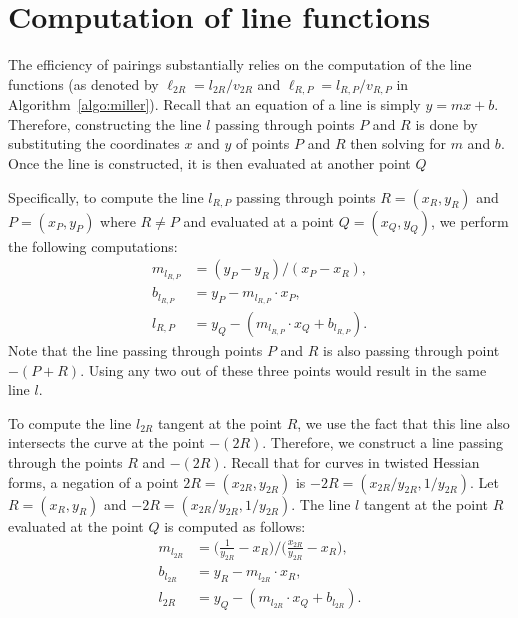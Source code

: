 \section{Computation of line functions}
\label{sec:lines}

The efficiency of pairings substantially relies on the computation of the line functions
(as denoted by $\ell_{2R} = l_{2R}/v_{2R}$ and $\ell_{R,P} = l_{R,P}/v_{R,P}$ in Algorithm~\ref{algo:miller}).
Recall that an equation of a line is simply $y = mx + b$.
Therefore, constructing the line $l$ passing through points $P$ and $R$
is done by substituting the coordinates $x$ and $y$ of points $P$ and $R$
then solving for $m$ and $b$.
Once the line is constructed, it is then evaluated at another point $Q$

Specifically, to compute the line $l_{R,P}$ passing through
points $R = (x_R, y_R)$ and $P = (x_P, y_P)$ where $R \ne P$
and evaluated at a point $Q = (x_Q, y_Q)$,
we perform the following computations:
\begin{align*}
m_{l_{R,P}} &= (y_P - y_R)/(x_P - x_R),			\\
b_{l_{R,P}} &= y_P - m_{l_{R,P}} \cdot x_P,		\\
l_{R,P} &= y_Q - (m_{l_{R,P}} \cdot x_Q + b_{l_{R,P}}). 
\end{align*}
Note that %
the line passing through points $P$ and $R$ is also passing through point $-(P+R)$.
Using any two out of these three points would result in the same line $l$.

To compute the line $l_{2R}$ tangent at the point $R$,
we use the fact that this line also intersects the curve at the point $-(2R)$.
Therefore, we construct a line passing through the points $R$ and $-(2R)$.
Recall that for curves in twisted Hessian forms,
a negation of a point $2R = (x_{2R}, y_{2R})$ is $-2R = (x_{2R}/y_{2R}, 1/y_{2R})$.
Let $R = (x_{R}, y_{R})$
and $-2R = (x_{2R}/y_{2R}, 1/y_{2R})$. %
The line $l$ tangent at the point $R$ evaluated at the point $Q$ is computed as follows:
\begin{align*}
m_{l_{2R}} &= \bigg( \frac{1}{y_{2R}} - x_{R} \bigg) / \bigg( \frac{x_{2R}}{y_{2R}} - x_{R} \bigg),	\\
b_{l_{2R}} &= y_R - m_{l_{2R}} \cdot x_R,		\\
l_{2R} &= y_Q - (m_{l_{2R}} \cdot x_Q + b_{l_{2R}}).
\end{align*}

